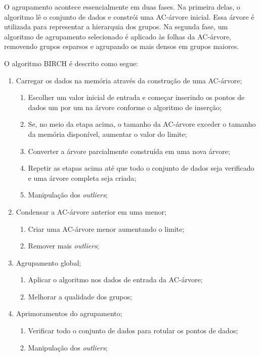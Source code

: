 O agrupamento acontece essencialmente em duas fases. Na primeira delas, o algoritmo lê o conjunto de dados e constrói uma AC-árvore inicial. Essa árvore é utilizada para representar a hierarquia dos grupos. Na segunda fase, um algoritmo de agrupamento selecionado é aplicado às folhas da AC-árvore, removendo grupos esparsos e agrupando os mais densos em grupos maiores.

O algoritmo \acrshort{BIRCH} é descrito como segue:

\begin{enumerate}
    \item Carregar os dados na memória através da construção de uma AC-árvore;
        \begin{enumerate}
            \item Escolher um valor inicial de entrada e começar inserindo os pontos de dados um por um na árvore conforme o algoritmo de inserção;
            \item Se, no meio da etapa acima, o tamanho da AC-árvore exceder o tamanho da memória disponível, aumentar o valor do limite;
            \item Converter a árvore parcialmente construída em uma nova árvore;
            \item Repetir as etapas acima até que todo o conjunto de dados seja verificado e uma árvore completa seja criada;
            \item Manipulação dos \textit{outliers};
        \end{enumerate}
    \item Condensar a AC-árvore anterior em uma menor;
        \begin{enumerate}
            \item Criar uma AC-árvore menor aumentando o limite;
            \item Remover mais \textit{outliers};
        \end{enumerate}
    \item Agrupamento global;
        \begin{enumerate}
            \item Aplicar o algoritmo nos dados de entrada da AC-árvore;
            \item Melhorar a qualidade dos grupos;
        \end{enumerate}    
    \item Aprimoramentos do agrupamento;
        \begin{enumerate}
            \item Verificar todo o conjunto de dados para rotular os pontos de dados;
            \item Manipulação dos \textit{outliers};
        \end{enumerate}    
\end{enumerate}

